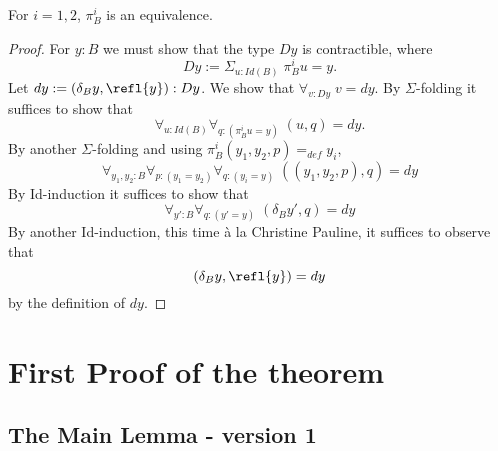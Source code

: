\begin{lem}\label{lem:4.10}
For $i=1,2$, $\pi^i_B$ is an equivalence.
\end{lem}
\begin{proof} For $y:B$ we must show that the type $Dy$ is contractible, where
  \[ Dy := \Sigma_{u:Id(B)}\; \pi^i_Bu=y.\]
Let $dy:=(\delta_By,\refl{y}):Dy$.  We show that $\forall_{v:Dy}\; v=dy$.
By $\Sigma$-folding it suffices to show that
  \[ \forall_{u:Id(B)}\forall_{q:(\pi^i_Bu=y)}\; (u,q)=dy.\]
By another $\Sigma$-folding and using $\pi^i_B(y_1,y_2,p)=_{def}y_i$,
  \[\forall_{y_1,y_2:B}\forall_{p:(y_1=y_2)}\forall_{q:(y_i=y)}
       \;  ((y_1,y_2,p),q)=dy
  \]
By Id-induction it suffices to show that
  \[ \forall_{y':B}\forall_{q:(y'=y)}\; (\delta_By',q)=dy\]
By another Id-induction, this time \`{a} la Christine Pauline, it suffices to observe that
  \[ (\delta_By,\refl{y})=dy\]
by the definition of $dy$.
\end{proof}

\section{First Proof of the theorem}


\subsection{ The Main Lemma - version 1}

